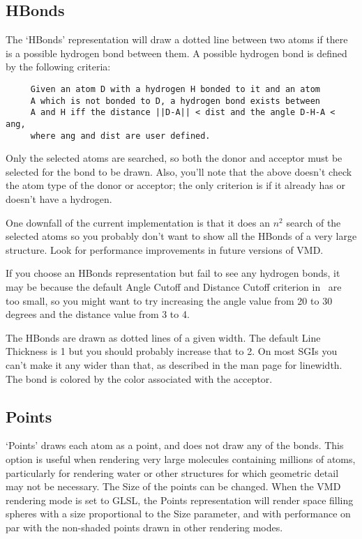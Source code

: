 \subsection{HBonds}
The `HBonds' representation will draw a dotted line between two atoms
if there is a possible hydrogen bond between them.  A possible
hydrogen bond is defined by the following criteria:
\begin{verbatim}
     Given an atom D with a hydrogen H bonded to it and an atom
     A which is not bonded to D, a hydrogen bond exists between
     A and H iff the distance ||D-A|| < dist and the angle D-H-A < ang,
     where ang and dist are user defined.
\end{verbatim}

Only the selected atoms are searched, so both the donor and acceptor
must be selected for the bond to be drawn.  Also, you'll note that the
above doesn't check the atom type of the donor or acceptor; the only
criterion is if it already has or doesn't have a hydrogen.  

One downfall of the current implementation is that it does an
$n^2$ search of the selected atoms so you probably don't want to
show all the HBonds of a very large structure. Look for performance
improvements in future versions of VMD.

If you choose an HBonds representation but fail to see any hydrogen
bonds, it may be because the default {\sf Angle Cutoff} and {\sf Distance
Cutoff} criterion in \VMD\ are too small, so you might want to try
increasing the angle value from 20 to 30 degrees and the distance value from
3 to 4.

The HBonds are drawn as dotted lines of a given width.  The default
{\sf Line Thickness} is 1 but you should probably increase that to 2.  On
most SGIs you can't make it any wider than that, as described in the man
page for linewidth.  The bond is colored by the color associated with the
acceptor.


\subsection{Points}
`Points' draws each atom as a point, and does not draw any of the
bonds.  This option is useful when rendering very large molecules
containing millions of atoms, particularly for rendering
water or other structures for which geometric detail may not be necessary.
The {\sf Size} of the points can be changed.  When the VMD rendering 
mode is set to GLSL, the Points representation will render 
space filling spheres with a size proportional to the {\sf Size}
parameter, and with performance on par with the non-shaded points
drawn in other rendering modes.

